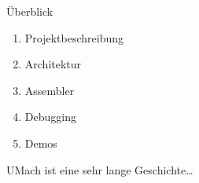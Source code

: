 
\begin{frame}{Überblick}
 \begin{enumerate}
  \item Projektbeschreibung
  \item Architektur
  \item Assembler
  \item Debugging
  \item Demos
 \end{enumerate} 
 UMach ist eine sehr lange Geschichte\ldots
\end{frame}

